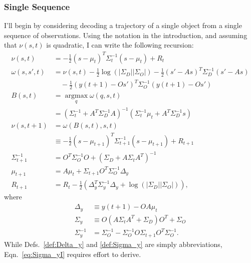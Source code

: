 \documentclass[11pt]{article}
\newcommand{\ti}[2]{{#1}{(#2)}}                         %
\newcommand{\argmax}{\operatorname*{argmax}}
\newcommand{\logdet}{\log\left(\left|\Sigma_D\right| \left| \Sigma_O
    \right| \right)}
\begin{document}
\subsubsection{Single Sequence}
\label{sec:single-sequence}

I'll begin by considering decoding a trajectory of a single object
from a single sequence of observations.  Using the notation in the
introduction, and assuming that $\nu(s,t)$ is quadratic, I can write
the following recursion:
\begin{align}
  \nu(s,t) &= -\frac{1}{2}(s-\mu_{t})^T
    \Sigma_{t}^{-1}(s-\mu_{t}) + R_t \nonumber \\
  \label{eq:decode_u'}
  \omega(s,s',t) &= \nu(s,t) -\frac{1}{2} \logdet  - 
  \frac{1}{2}(s'-As)^T \Sigma_{D}^{-1} (s'-As)  \nonumber \\
  &\quad - \frac{1}{2}(\ti{y}{t+1} - O s')^T \Sigma_{O}^{-1}(\ti{y}{t+1}
    - O s') \\
  B(s,t) &= \argmax_{q} \omega(q,s,t) \nonumber \\
  \label{eq:decode_B}
  &= \left( \Sigma_t^{-1} + A^T \Sigma_D^{-1} A \right)^{-1} \left(
    \Sigma_t^{-1} \mu_t + A^T \Sigma_D^{-1} s \right) \\
  \nu(s,t+1) &= \omega(B(s,t),s,t) \nonumber \\
  &\equiv  -\frac{1}{2}(s-\mu_{t+1})^T
  \Sigma_{t+1}^{-1}(s-\mu_{t+1}) + R_{t+1} \nonumber \\
  \label{eq:new_Sigma}
  \Sigma_{t+1}^{-1} & = O^T\Sigma_O^{-1} O + \left( \Sigma_D + A \Sigma_t
    A^T \right)^{-1} \\
  \label{eq:new_mu}
  \mu_{t+1} &= A \mu_t + \Sigma_{t+1} O^T \Sigma_O^{-1} \Delta_y \\
  \label{eq:new_R}
  R_{t+1} &= R_t -\frac{1}{2} \left( \Delta_y^T \Sigma_y^{-1} \Delta_y
    + \logdet \right),
\end{align}
where
\begin{align}
  \label{def:Delta_y}
  \Delta_y &\equiv \ti{y}{t+1} - OA \mu_t \\
  \label{def:Sigma_y}
  \Sigma_y &\equiv O(A\Sigma_t A^T + \Sigma_D)O^T + \Sigma_O \\
  \label{eq:Sigma_yI}
  \Sigma_y^{-1} &= \Sigma_O^{-1} - \Sigma_O^{-1} O \Sigma_{t+1} O^T
  \Sigma_O^{-1}.
\end{align}
While Defs.~\eqref{def:Delta_y} and  \eqref{def:Sigma_y} are simply
abbreviations, Eqn.~\eqref{eq:Sigma_yI} requires effort to derive.
\end{document}

